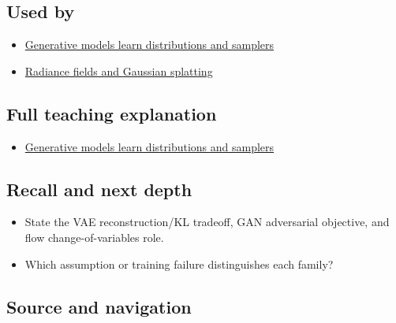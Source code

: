 \subsection{Used by}\label{used-by}

\begin{itemize}
\tightlist
\item
  \href{Continuous\%20Notes/University\%20-\%20Worlds,\%20Images\%20and\%20Inference\%20-\%20Graphics,\%20Vision\%20and\%20Photography\#Generative\%20models\%20learn\%20distributions\%20and\%20samplers}{Generative models learn distributions and samplers}
\item
  \hyperref[appendix-c5b332e400e7]{Radiance fields and Gaussian splatting}
\end{itemize}

\subsection{Full teaching explanation}\label{full-teaching-explanation}

\begin{itemize}
\tightlist
\item
  \href{Continuous\%20Notes/University\%20-\%20Worlds,\%20Images\%20and\%20Inference\%20-\%20Graphics,\%20Vision\%20and\%20Photography\#Generative\%20models\%20learn\%20distributions\%20and\%20samplers}{Generative models learn distributions and samplers}
\end{itemize}

\subsection{Recall and next depth}\label{recall-and-next-depth}

\begin{itemize}
\tightlist
\item
  State the VAE reconstruction/KL tradeoff, GAN adversarial objective, and flow change-of-variables role.
\item
  Which assumption or training failure distinguishes each family?
\end{itemize}

\subsection{Source and navigation}\label{source-and-navigation}

